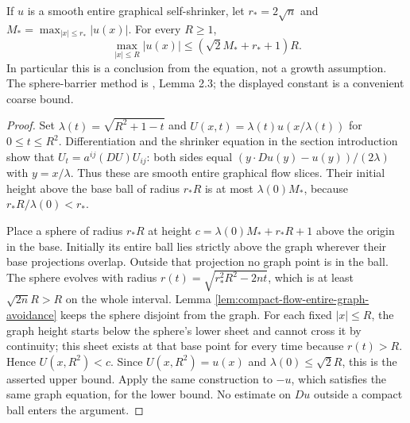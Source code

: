 \begin{lemma}\label{lem:shrinker-graph-linear-height}
If $u$ is a smooth entire graphical self-shrinker, let $r_*=2\sqrt n$ and $M_* =\max_{|x|\leq r_*}|u(x)|$. For every $R\geq1$,
\[
 \max_{|x|\leq R}|u(x)|
      \leq (\sqrt2 M_*+r_*+1)R.
\]
In particular this is a conclusion from the equation, not a growth assumption. The sphere-barrier method is \cite{Wang09}, Lemma 2.3; the displayed constant is a convenient coarse bound.
\end{lemma}
\begin{proof}
Set $\lambda(t)=\sqrt{R^2+1-t}$ and
$U(x,t)=\lambda(t)u(x/\lambda(t))$ for $0\leq t\leq R^2$.
Differentiation and the shrinker equation in the section introduction show that $U_t=a^{ij}(DU)U_{ij}$: both sides equal $(y\cdot Du(y)-u(y))/(2\lambda)$ with $y=x/\lambda$. Thus these are smooth entire graphical flow slices. Their initial height above the base ball of radius $r_*R$ is at most $\lambda(0)M_*$, because $r_*R/\lambda(0)<r_*$.

Place a sphere of radius $r_*R$ at height
$c=\lambda(0)M_*+r_*R+1$ above the origin in the base. Initially its entire ball lies strictly above the graph wherever their base projections overlap. Outside that projection no graph point is in the ball. The sphere evolves with radius
$r(t)=\sqrt{r_*^2R^2-2nt}$, which is at least $\sqrt{2n}R>R$ on the whole interval. Lemma \ref{lem:compact-flow-entire-graph-avoidance} keeps the sphere disjoint from the graph. For each fixed $|x|\leq R$, the graph height starts below the sphere's lower sheet and cannot cross it by continuity; this sheet exists at that base point for every time because $r(t)>R$. Hence $U(x,R^2)<c$. Since $U(x,R^2)=u(x)$ and $\lambda(0)\leq\sqrt2R$, this is the asserted upper bound. Apply the same construction to $-u$, which satisfies the same graph equation, for the lower bound. No estimate on $Du$ outside a compact ball enters the argument.
\end{proof}

